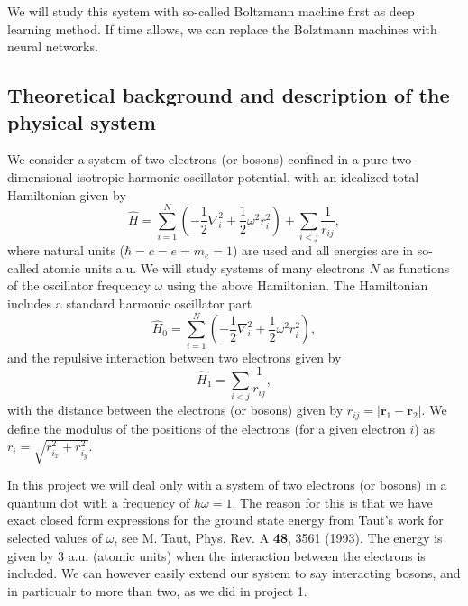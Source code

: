 \documentclass[%
oneside,                 %
final,                   %
10pt]{article}
\begin{document}
We will study this system with so-called Boltzmann machine first as deep learning method. If time allows, we can replace the Bolztmann machines with neural networks.

\subsection*{Theoretical background and description of the physical system}

We consider a system of two electrons (or bosons) confined in a pure two-dimensional 
isotropic harmonic oscillator potential, with an idealized  total Hamiltonian given by
\begin{equation}
\label{eq:finalH}
\hat{H}=\sum_{i=1}^{N} \left(  -\frac{1}{2} \nabla_i^2 + \frac{1}{2} \omega^2r_i^2  \right)+\sum_{i<j}\frac{1}{r_{ij}},
\end{equation}
where natural units ($\hbar=c=e=m_e=1$) are used and all energies are in so-called atomic units a.u. We will study systems of many electrons $N$ as functions of the oscillator frequency  $\omega$ using the above Hamiltonian.  The Hamiltonian includes a standard harmonic oscillator part
\begin{equation*}
\hat{H}_0=\sum_{i=1}^{N} \left(  -\frac{1}{2} \nabla_i^2 + \frac{1}{2} \omega^2r_i^2  \right),
\end{equation*}
and the repulsive interaction between two electrons given by
\begin{equation*}
\hat{H}_1=\sum_{i<j}\frac{1}{r_{ij}},
\end{equation*}
with the distance between the electrons (or bosons)  given by $r_{ij}=\vert \bm{r}_1-\bm{r}_2\vert$. We define the 
modulus of the positions of the electrons (for a given electron $i$) as $r_i = \sqrt{r_{i_x}^2+r_{i_y}^2}$.

In this project  we will deal only with a system of
two electrons (or bosons) in a quantum dot with a frequency of $\hbar\omega = 1$. 
The reason for this is that we have exact closed form expressions 
for the ground state energy from Taut's work for selected values of $\omega$, 
see M. Taut, Phys. Rev. A \textbf{48}, 3561 (1993).
The energy is given by $3$ a.u.  (atomic units) when the interaction between the electrons is included. We can however easily extend our system to say interacting bosons, and in particualr to more than two,  as we did in project 1.
\end{document}
